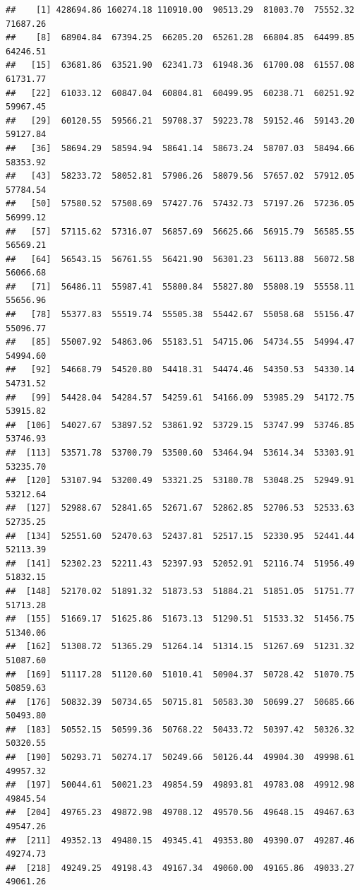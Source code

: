 \documentclass[
]{article}
\begin{document}
\begin{verbatim}
##    [1] 428694.86 160274.18 110910.00  90513.29  81003.70  75552.32  71687.26
##    [8]  68904.84  67394.25  66205.20  65261.28  66804.85  64499.85  64246.51
##   [15]  63681.86  63521.90  62341.73  61948.36  61700.08  61557.08  61731.77
##   [22]  61033.12  60847.04  60804.81  60499.95  60238.71  60251.92  59967.45
##   [29]  60120.55  59566.21  59708.37  59223.78  59152.46  59143.20  59127.84
##   [36]  58694.29  58594.94  58641.14  58673.24  58707.03  58494.66  58353.92
##   [43]  58233.72  58052.81  57906.26  58079.56  57657.02  57912.05  57784.54
##   [50]  57580.52  57508.69  57427.76  57432.73  57197.26  57236.05  56999.12
##   [57]  57115.62  57316.07  56857.69  56625.66  56915.79  56585.55  56569.21
##   [64]  56543.15  56761.55  56421.90  56301.23  56113.88  56072.58  56066.68
##   [71]  56486.11  55987.41  55800.84  55827.80  55808.19  55558.11  55656.96
##   [78]  55377.83  55519.74  55505.38  55442.67  55058.68  55156.47  55096.77
##   [85]  55007.92  54863.06  55183.51  54715.06  54734.55  54994.47  54994.60
##   [92]  54668.79  54520.80  54418.31  54474.46  54350.53  54330.14  54731.52
##   [99]  54428.04  54284.57  54259.61  54166.09  53985.29  54172.75  53915.82
##  [106]  54027.67  53897.52  53861.92  53729.15  53747.99  53746.85  53746.93
##  [113]  53571.78  53700.79  53500.60  53464.94  53614.34  53303.91  53235.70
##  [120]  53107.94  53200.49  53321.25  53180.78  53048.25  52949.91  53212.64
##  [127]  52988.67  52841.65  52671.67  52862.85  52706.53  52533.63  52735.25
##  [134]  52551.60  52470.63  52437.81  52517.15  52330.95  52441.44  52113.39
##  [141]  52302.23  52211.43  52397.93  52052.91  52116.74  51956.49  51832.15
##  [148]  52170.02  51891.32  51873.53  51884.21  51851.05  51751.77  51713.28
##  [155]  51669.17  51625.86  51673.13  51290.51  51533.32  51456.75  51340.06
##  [162]  51308.72  51365.29  51264.14  51314.15  51267.69  51231.32  51087.60
##  [169]  51117.28  51120.60  51010.41  50904.37  50728.42  51070.75  50859.63
##  [176]  50832.39  50734.65  50715.81  50583.30  50699.27  50685.66  50493.80
##  [183]  50552.15  50599.36  50768.22  50433.72  50397.42  50326.32  50320.55
##  [190]  50293.71  50274.17  50249.66  50126.44  49904.30  49998.61  49957.32
##  [197]  50044.61  50021.23  49854.59  49893.81  49783.08  49912.98  49845.54
##  [204]  49765.23  49872.98  49708.12  49570.56  49648.15  49467.63  49547.26
##  [211]  49352.13  49480.15  49345.41  49353.80  49390.07  49287.46  49274.73
##  [218]  49249.25  49198.43  49167.34  49060.00  49165.86  49033.27  49061.26

\end{verbatim}
\end{document}
